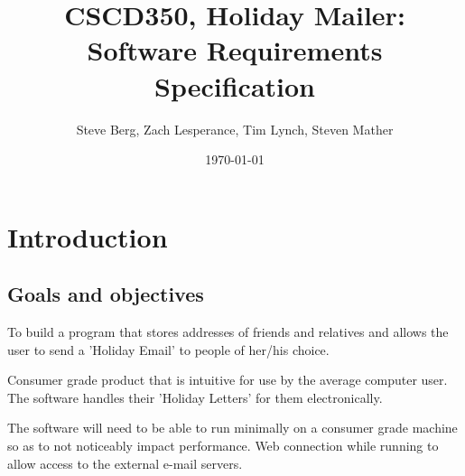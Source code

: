 \documentclass{article}
\title{CSCD350, Holiday Mailer: Software Requirements Specification}
\author{Steve Berg, Zach Lesperance, Tim Lynch, Steven Mather}
\date{\today}
\begin{document}
\maketitle{}
\pagebreak

\section{Introduction}

\subsection{Goals and objectives}
To build a program that stores addresses of friends and relatives and allows the user to send a 'Holiday Email' to people of her/his choice.


Consumer grade product that is intuitive for use by the average computer user. The software handles their 'Holiday Letters' for them electronically.

The software will need to be able to run minimally on a consumer grade machine so as to not noticeably impact performance.
Web connection while running to allow access to the external e-mail servers.

\end{document}
